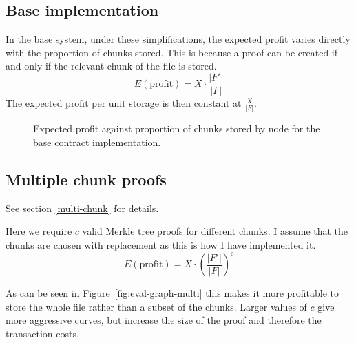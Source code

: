 \documentclass[12pt,a4paper,twoside,openright]{report}
\begin{document}
\newpage %
\subsection{Base implementation}

In the base system, under these simplifications,
the expected profit varies directly with the proportion of chunks stored.
This is because a proof can be created if and only if the relevant chunk of the file is stored.
\[E(\text{profit}) = X \cdot \frac{|F'|}{|F|}\]
The expected profit per unit storage is then constant at $\frac{X}{|F|}$.

\begin{figure}[h]

\caption[Expected attacker profit: base implementation]{Expected profit against proportion of chunks stored by node for the base contract implementation.}
\end{figure}


\subsection{Multiple chunk proofs}

See section \ref{multi-chunk} for details.

Here we require $c$ valid Merkle tree proofs for different chunks.
I assume that the chunks are chosen with replacement as this is how I have implemented it.
\[E(\text{profit}) = X \cdot \left(\frac{|F'|}{|F|}\right)^c\]

As can be seen in Figure~\ref{fig:eval-graph-multi} this makes it more profitable to store the whole file rather than a subset of the chunks.
Larger values of $c$ give more aggressive curves, but increase the size of the proof and therefore the transaction costs.
\end{document}
